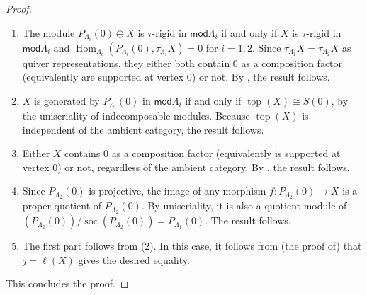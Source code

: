 \documentclass[11pt]{amsart}
\newcommand{\mods}{\mathsf{mod}}
\DeclareMathOperator{\Hom}{\mathrm{Hom}}
\DeclareMathOperator{\soc}{\mathrm{soc}}
\DeclareMathOperator{\topp}{\mathrm{top}}
\theoremstyle{definition}
\begin{document}
\begin{proof}
    \begin{enumerate}
        \item The module $P_{\Lambda_i}(0) \oplus X$ is $\tau$-rigid in $\mods \Lambda_i$ if and only if $X$ is $\tau$-rigid in $\mods \Lambda_i$ and $\Hom_{\Lambda_i}(P_{\Lambda_i}(0), \tau_{\Lambda_i} X) = 0$ for $i=1,2$. Since $\tau_{\Lambda_1} X = \tau_{\Lambda_2} X$ as quiver representations, they either both contain $0$ as a composition factor (equivalently are supported at vertex 0) or not. By \cite[Lem. III.2.11, Cor. III.3.6]{assem_skowronski_simson_2006}, the result follows.
        \item $X$ is generated by $P_{\Lambda_i}(0)$ in $\mods \Lambda_i$ if and only if $\topp(X) \cong S(0)$, by the uniseriality of indecomposable modules. Because $\topp(X)$ is independent of the ambient category, the result follows. 
        \item Either $X$ contains $0$ as a composition factor (equivalently is supported at vertex 0) or not, regardless of the ambient category. By \cite[Lem. III.2.11, Cor. III.3.6]{assem_skowronski_simson_2006}, the result follows.
        \item Since $P_{\Lambda_2}(0)$ is projective, the image of any morphism $f: P_{\Lambda_2}(0) \to X$ is a proper quotient of $P_{\Lambda_2}(0)$. By uniseriality, it is also a quotient module of $(P_{\Lambda_2}(0))/\soc(P_{\Lambda_2}(0)) = P_{\Lambda_1}(0)$. The result follows.
        \item The first part follows from (2). In this case, it follows from (the proof of) \cite[Thm. V.3.5]{assem_skowronski_simson_2006} that $j= \ell(X)$ gives the desired equality. 
    \end{enumerate}
    This concludes the proof.
\end{proof}
\end{document}
